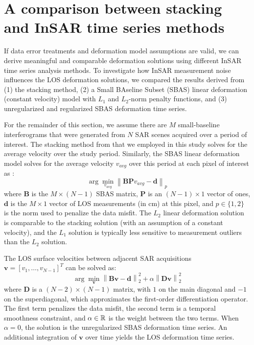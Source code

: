 \documentclass{utexasthesis}
\newcommand{\norm}[1]{\left\lVert#1\right\rVert}
\begin{document}
\section{A comparison between stacking and InSAR time series methods}
\label{sec:method-compare}
If data error treatments and deformation model assumptions are valid, we can derive meaningful and comparable deformation solutions using different InSAR time series analysis methods. To investigate how InSAR measurement noise influences the LOS deformation solutions, we compared the results derived from (1) the stacking method, (2) a Small BAseline Subset (SBAS) linear deformation (constant velocity) model with $L_1$ and $L_2$-norm penalty functions, and (3) unregularized and regularized SBAS deformation time series. 

For the remainder of this section, we assume there are $M$ small-baseline interferograms that were generated from $N$ SAR scenes acquired over a period of interest. The stacking method from \cite{Sandwell1998PhaseGradientApproach} that we employed in this study solves for the average velocity over the study period. Similarly, the SBAS linear deformation model solves for the average velocity $ v_{avg} $ over this period at each pixel of interest as \citep{Berardino2002NewAlgorithmSurface}:
\begin{equation}
	\arg \min_{v_{avg}} \norm{ \bm{BP} v_{avg} - \bm{d}   }_p
	\label{eq:sbas-linear}
\end{equation}
where $ \bm{B }$ is the $ M \times (N-1) $ SBAS matrix, $ \bm{P}$ is an $ (N-1) \times 1 $ vector of ones, $ \bm{d} $ is the $ M \times 1 $ vector of LOS measurements (in cm) at this pixel, and $ p \in \{1, 2\} $ is the norm used to penalize the data misfit. The $L_2$ linear deformation solution is comparable to the stacking solution (with an assumption of a constant velocity), and the $L_1$ solution is typically less sensitive to measurement outliers than the $L_2$ solution.

The LOS surface velocities between adjacent SAR acquisitions $ \bm{v} = \left[v_1 , \ldots , v_{N-1} \right]^T $ can be solved as:
\begin{equation}
	\arg \min_{\bm{v} } \norm{ \bm{Bv} - \bm{d}   }^2_2 + \alpha \norm{ \bm{Dv} }^2_2  \label{eq:sbas}
\end{equation}
where $ \bm{D} $ is a $ (N-2) \times (N-1) $ matrix, with $1$ on the main diagonal and $-1$ on the superdiagonal, which approximates the first-order differentiation operator. The first term penalizes the data misfit, the second term is a temporal smoothness constraint, and $ \alpha \in \Bbb{R} $ is the weight between the two terms. When $ \alpha = 0 $, the solution is the unregularized SBAS deformation time series. An additional integration of $\mathbf{v}$ over time yields the LOS deformation time series.
\end{document}
